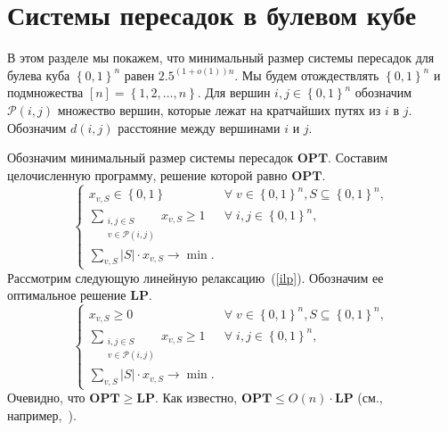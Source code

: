 \documentclass[12pt]{article}
\newcommand{\set}[1]{\left\{#1\right\}}
\newcommand{\abs}[1]{\left|#1\right|}
\newcommand{\zo}{\set{0, 1}}
\newcommand{\Pc}{\mathcal{P}}
\begin{document}
    \section{Системы пересадок в булевом кубе}
    \label{section_hub_labels}
    В этом разделе мы покажем, что минимальный размер системы пересадок для булева куба $\zo^n$ равен $2.5^{(1+o(1))n}$.
    Мы будем отождествлять $\zo^n$ и подмножества $[n] = \set{1, 2, \ldots, n}$. Для вершин $i, j \in \zo^n$ обозначим $\Pc(i, j)$ множество вершин, которые лежат
    на кратчайших путях из $i$ в $j$. Обозначим $d(i, j)$ расстояние между вершинами $i$ и $j$.

    Обозначим минимальный размер
    системы пересадок $\mathbf{OPT}$.
    Составим целочисленную программу, решение которой равно $\mathbf{OPT}$.
    \begin{equation}
        \label{ilp}
        \begin{cases}
            x_{v,S} \in \zo & \forall \; v \in \zo^n, S \subseteq \zo^n, \\ 
            \sum_{\begin{smallmatrix}i, j \in S \\ v \in \Pc(i, j)\end{smallmatrix}} x_{v,S} \geq 1 & \forall \; i, j \in \zo^n, \\
            \sum_{v,S} |S| \cdot x_{v,S} \to \min.
        \end{cases}
    \end{equation}
    Рассмотрим следующую линейную релаксацию~(\ref{ilp}). Обозначим ее оптимальное решение $\mathbf{LP}$.
    \begin{equation}
        \label{lp}
        \begin{cases}
            x_{v,S} \geq 0 & \forall \; v \in \zo^n, S \subseteq \zo^n, \\ 
            \sum_{\begin{smallmatrix}i, j \in S \\ v \in \Pc(i, j)\end{smallmatrix}} x_{v,S} \geq 1 & \forall \; i, j \in \zo^n, \\
            \sum_{v,S} \abs{S} \cdot x_{v,S} \to \min.
        \end{cases}
    \end{equation}
    Очевидно, что $\mathbf{OPT} \geq \mathbf{LP}$. Как известно, $\mathbf{OPT} \leq O(n) \cdot \mathbf{LP}$
    (см., например,~\cite{V04}).
\end{document}
